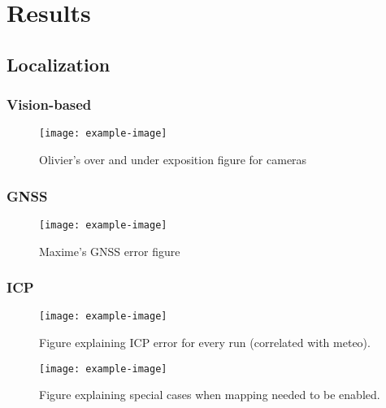 \section{Results}
\label{sec:results}

\lightlipsum[1]


\subsection{Localization}
\label{sec:res_loc}

\lightlipsum[1]

\subsubsection{Vision-based}
\label{sec:res_vis}

\lightlipsum[1]

\begin{figure} [htpb]
	\centering
	\texttt{[image: example-image]}
	\caption{Olivier's over and under exposition figure for cameras}
	\label{fig:cameras_expo}
\end{figure}

\subsubsection{GNSS}
\label{sec:res_gnss}

\lightlipsum[1]

\begin{figure} [htpb]
	\centering
	\texttt{[image: example-image]}
	\caption{Maxime's GNSS error figure}
	\label{fig:gnss_error}
\end{figure}

\subsubsection{ICP}
\label{sec:ICP}

\lightlipsum[1]

\begin{figure} [htpb]
	\centering
	\texttt{[image: example-image]}
	\caption{Figure explaining ICP error for every run (correlated with meteo).}
	\label{fig:icp_error}
\end{figure}

\begin{figure} [htpb]
	\centering
	\texttt{[image: example-image]}
	\caption{Figure explaining special cases when mapping needed to be enabled.}
	\label{fig:icp_failure}
\end{figure}


